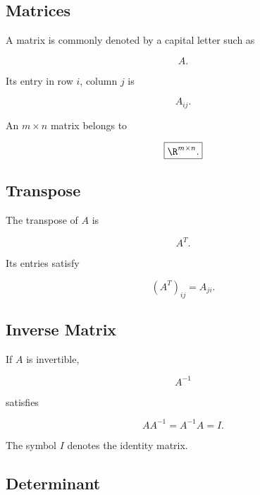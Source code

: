\subsection{Matrices}
\label{subsec:matrix-notation-reference}

A matrix is commonly denoted by a capital letter such as

\[
\boxed{
A.
}
\]

Its entry in row \(i\), column \(j\) is

\[
\boxed{
A_{ij}.
}
\]

An \(m\times n\) matrix belongs to

\[
\boxed{
\R^{m\times n}.
}
\]

\subsection{Transpose}
\label{subsec:transpose-symbol-reference}

The transpose of \(A\) is

\[
\boxed{
A^T.
}
\]

Its entries satisfy

\[
\boxed{
(A^T)_{ij}
=
A_{ji}.
}
\]

\subsection{Inverse Matrix}
\label{subsec:inverse-matrix-reference}

If \(A\) is invertible,

\[
\boxed{
A^{-1}
}
\]

satisfies

\[
\boxed{
AA^{-1}
=
A^{-1}A
=
I.
}
\]

The symbol \(I\) denotes the identity matrix.

\subsection{Determinant}
\label{subsec:determinant-symbol-reference}

